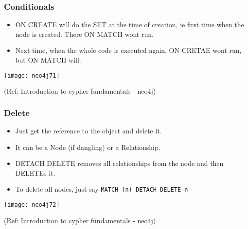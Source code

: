 \begin{frame}[fragile]\frametitle{Conditionals}

\begin{itemize}
\item ON CREATE will do the SET at the time of creation, ie first time when the node is created. There ON MATCH wont run.
\item Next time, when the whole code is executed again, ON CRETAE wont run, but ON MATCH will.
\end{itemize}

\begin{center}
\texttt{[image: neo4j71]}
\end{center}	  


{\tiny (Ref: Introduction to cypher fundamentals  - neo4j)}
 

\end{frame}

\begin{frame}[fragile]\frametitle{Delete}

\begin{itemize}
\item Just get the reference to the object and delete it.
\item It can be a Node (if dangling) or a Relationship.
\item DETACH DELETE removes all relationships from the node and then DELETEs it.
\item To delete all nodes, just say \lstinline|MATCH (n) DETACH DELETE n|
\end{itemize}

\begin{center}
\texttt{[image: neo4j72]}
\end{center}	  


{\tiny (Ref: Introduction to cypher fundamentals  - neo4j)}
 

\end{frame}


